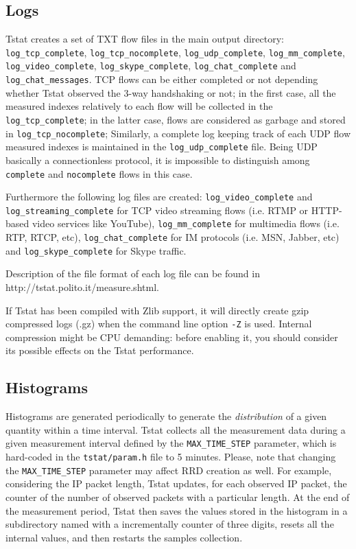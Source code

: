 \documentclass[11pt]{article}
\begin{document}
\subsection{Logs\label{Logs}}


Tstat creates a set of TXT flow files in the main output directory: \texttt{log\_tcp\_complete},
\texttt{log\_tcp\_nocomplete}, \texttt{log\_udp\_complete}, \texttt{log\_mm\_complete}, \texttt{log\_video\_complete},
\texttt{log\_skype\_complete}, \texttt{log\_chat\_complete} and \texttt{log\_chat\_messages}.
TCP flows can be either completed or not depending whether Tstat observed the
3-way handshaking or not; in the first case, all the measured indexes relatively
to each flow will be collected in the \texttt{log\_tcp\_complete}; in the latter
case,  flows are considered as garbage and stored in \texttt{log\_tcp\_nocomplete};
Similarly, a complete log keeping track of each UDP flow measured indexes is
maintained in the \texttt{log\_udp\_complete} file. Being UDP basically a
connectionless protocol, it is impossible to distinguish among \texttt{complete} and
\texttt{nocomplete} flows in this case.



Furthermore the following log files are created: \texttt{log\_video\_complete} and
\texttt{log\_streaming\_complete} for TCP video 
streaming flows (i.e. RTMP or HTTP-based video services like YouTube), 
\texttt{log\_mm\_complete} for multimedia flows
(i.e. RTP, RTCP, etc), \texttt{log\_chat\_complete} for IM protocols (i.e. MSN, Jabber, etc) and
\texttt{log\_skype\_complete} for Skype traffic.



Description of the file format of each log file can be found in
\textsf{http://tstat.polito.it/measure.shtml}.



If Tstat has been compiled with Zlib support, it will directly create gzip compressed 
logs (.gz) when the command line option \texttt{-Z} is used. Internal compression might be 
CPU demanding: before enabling it, you should consider its possible effects on the Tstat 
performance.

\subsection{Histograms\label{Histograms}}


Histograms are generated periodically to generate the \textit{distribution} of a 
given quantity within a time interval. Tstat collects all the
measurement data during a given measurement interval defined by the \texttt{MAX\_TIME\_STEP} 
parameter, which is hard-coded in the \texttt{tstat/param.h} file to 5 minutes. Please, note
that changing the \texttt{MAX\_TIME\_STEP} parameter may affect RRD creation as well.
For example, considering the IP packet length, Tstat updates, for
each observed IP packet, the counter of the number of observed packets with a
particular length. At the end of the measurement period, Tstat then saves
the values stored in the histogram in a subdirectory named with a incrementally counter
of three digits, resets all the internal values, and then restarts 
the samples collection.
\end{document}
